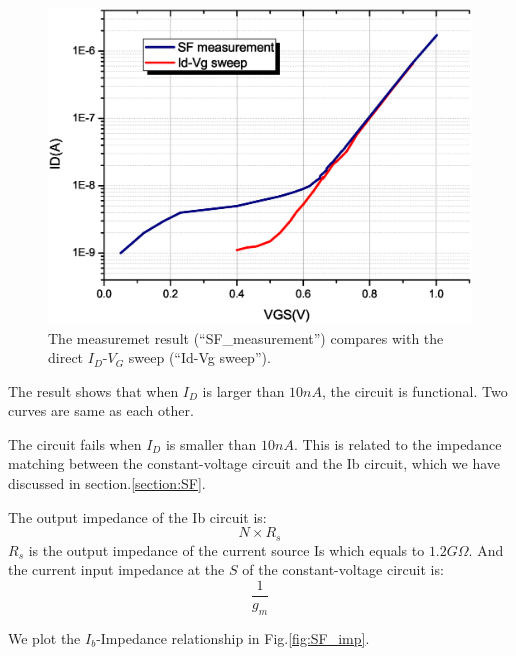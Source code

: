 \begin{figure}[!htbp]
   \centering
   \includegraphics[width=1\textwidth]{images/chapter4/SF.eps}
   \caption{The measuremet result (``SF\_measurement'') compares with the direct $I_D$-$V_G$ sweep (``Id-Vg sweep'').}
   \label{fig:SF_result}
\end{figure}

The result shows that when $I_D$ is larger than $10n A$, the circuit is functional.
Two curves are same as each other.

The circuit fails when $I_D$ is smaller than $10n A$.
This is related to the impedance matching between the constant-voltage circuit and the Ib circuit, which we have discussed in section.\ref{section:SF}.

The output impedance of the Ib circuit is:
\begin{equation} \label{eq:rcs2_again}
    N\times R_s
\end{equation}
$R_s$ is the output impedance of the current source Is which equals to $1.2G\Omega$.
And the current input impedance at the $S$ of the constant-voltage circuit is:
\begin{equation} \label{eq:rsf2_again}
    \frac{1}{g_m}
\end{equation}

We plot the $I_b$-Impedance relationship in Fig.\ref{fig:SF_imp}.

